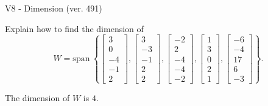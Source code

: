 \begin{exercise}
  \begin{exerciseTitle}V8 - Dimension (ver. 491)\end{exerciseTitle}
  \begin{exerciseStatement}
    Explain how to find the dimension of 
\[W=\mathrm{span}\ \left\{\left[\begin{array}{r}
3 \\
0 \\
-4 \\
-1 \\
2
\end{array}\right] , \left[\begin{array}{r}
3 \\
-3 \\
-1 \\
2 \\
2
\end{array}\right] , \left[\begin{array}{r}
-2 \\
2 \\
-4 \\
-4 \\
-2
\end{array}\right] , \left[\begin{array}{r}
1 \\
3 \\
0 \\
2 \\
1
\end{array}\right] , \left[\begin{array}{r}
-6 \\
-4 \\
17 \\
6 \\
-3
\end{array}\right]\right\}.\]



  \end{exerciseStatement}
  \begin{exerciseAnswer}
   The dimension of \(W\) is  \(4\).
  


  \end{exerciseAnswer}
\end{exercise}